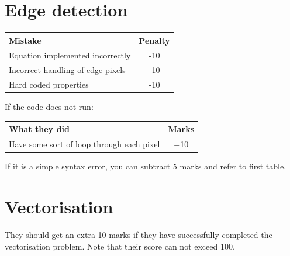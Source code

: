 \section{Edge detection}
\begin{table}[H]
    \begin{tabular}{l|c}
    \textbf{Mistake}                                                                        & \textbf{Penalty} \\ \hline
    Equation implemented incorrectly                                                               & -10     \\ \hline
    Incorrect handling of edge pixels                                                               & -10     \\ \hline
    Hard coded properties                                                          & -10     \\ \hline
  
    \end{tabular}
\end{table}

If the code does not run:
\begin{table}[H]
    \begin{tabular}{l|c}
    \textbf{What they did}                                                                        & \textbf{Marks} \\ \hline
    Have some sort of loop through each pixel                                                     & +10     \\ \hline
    \end{tabular}
\end{table}
If it is a simple syntax error, you can subtract 5 marks and refer to first table.

\section{Vectorisation}
They should get an extra 10 marks if they have successfully completed the vectorisation problem. Note that their score can not exceed 100.


